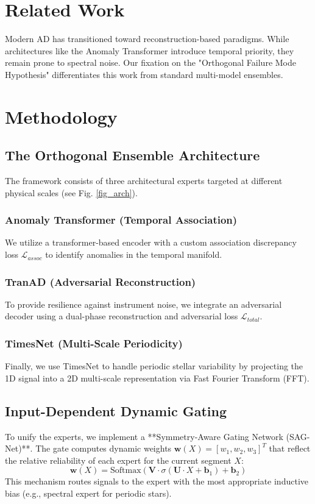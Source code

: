 \documentclass[journal,twoside,web]{IEEEtran}
\begin{document}
\section{Related Work}
Modern AD has transitioned toward reconstruction-based paradigms. While architectures like the Anomaly Transformer introduce temporal priority, they remain prone to spectral noise. Our fixation on the "Orthogonal Failure Mode Hypothesis" differentiates this work from standard multi-model ensembles.

\section{Methodology}
\subsection{The Orthogonal Ensemble Architecture}
The framework consists of three architectural experts targeted at different physical scales (see Fig. \ref{fig_arch}).

\subsubsection{Anomaly Transformer (Temporal Association)}
We utilize a transformer-based encoder with a custom association discrepancy loss $\mathcal{L}_{assoc}$ to identify anomalies in the temporal manifold.

\subsubsection{TranAD (Adversarial Reconstruction)}
To provide resilience against instrument noise, we integrate an adversarial decoder using a dual-phase reconstruction and adversarial loss $\mathcal{L}_{total}$.

\subsubsection{TimesNet (Multi-Scale Periodicity)}
Finally, we use TimesNet to handle periodic stellar variability by projecting the 1D signal into a 2D multi-scale representation via Fast Fourier Transform (FFT).

\subsection{Input-Dependent Dynamic Gating}
To unify the experts, we implement a **Symmetry-Aware Gating Network (SAG-Net)**. The gate computes dynamic weights $\mathbf{w}(X) = [w_1, w_2, w_3]^T$ that reflect the relative reliability of each expert for the current segment $X$:
\begin{equation}
\mathbf{w}(X) = \text{Softmax}(\mathbf{V} \cdot \sigma(\mathbf{U} \cdot X + \mathbf{b}_1) + \mathbf{b}_2)
\end{equation}
This mechanism routes signals to the expert with the most appropriate inductive bias (e.g., spectral expert for periodic stars).
\end{document}
